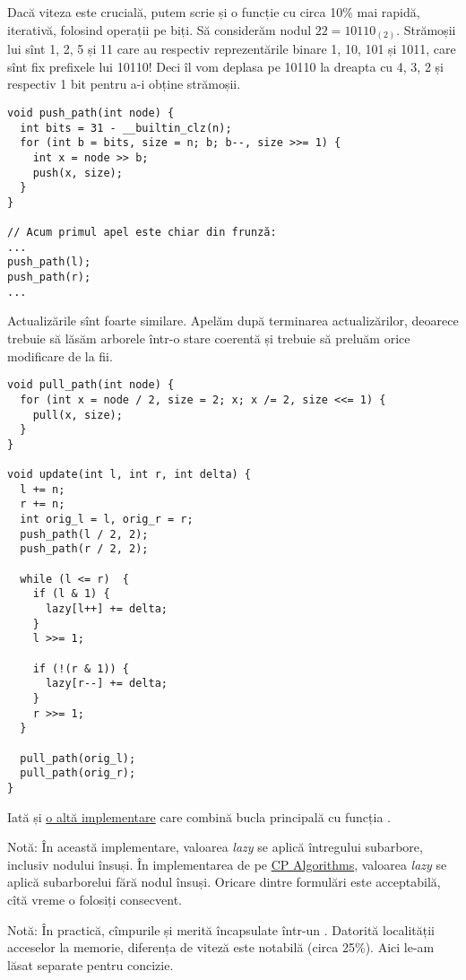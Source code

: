 Dacă viteza este crucială, putem scrie și o funcție  cu circa 10\% mai rapidă, iterativă, folosind operații pe biți. Să considerăm nodul $22=10110_{(2)}$. Strămoșii lui sînt 1, 2, 5 și 11 care au respectiv reprezentările binare 1, 10, 101 și 1011, care sînt fix prefixele lui 10110! Deci îl vom deplasa pe 10110 la dreapta cu 4, 3, 2 și respectiv 1 bit pentru a-i obține strămoșii.

\begin{verbatim}
void push_path(int node) {
  int bits = 31 - __builtin_clz(n);
  for (int b = bits, size = n; b; b--, size >>= 1) {
    int x = node >> b;
    push(x, size);
  }
}

// Acum primul apel este chiar din frunză:
...
push_path(l);
push_path(r);
...
\end{verbatim}

Actualizările sînt foarte similare. Apelăm  după terminarea actualizărilor, deoarece trebuie să lăsăm arborele într-o stare coerentă și trebuie să preluăm orice modificare de la fii.

\begin{verbatim}
void pull_path(int node) {
  for (int x = node / 2, size = 2; x; x /= 2, size <<= 1) {
    pull(x, size);
  }
}

void update(int l, int r, int delta) {
  l += n;
  r += n;
  int orig_l = l, orig_r = r;
  push_path(l / 2, 2);
  push_path(r / 2, 2);

  while (l <= r)  {
    if (l & 1) {
      lazy[l++] += delta;
    }
    l >>= 1;

    if (!(r & 1)) {
      lazy[r--] += delta;
    }
    r >>= 1;
  }

  pull_path(orig_l);
  pull_path(orig_r);
}
\end{verbatim}

Iată și \href{https://codeforces.com/blog/entry/18051}{o altă implementare} care combină bucla  principală cu funcția .

Notă: În această implementare, valoarea \textit{lazy} se aplică întregului subarbore, inclusiv nodului însuși. În implementarea de pe \href{https://cp-algorithms.com/data_structures/segment_tree.html#adding-on-segments-querying-for-maximum}{CP Algorithms}, valoarea \textit{lazy} se aplică subarborelui fără nodul însuși. Oricare dintre formulări este acceptabilă, cîtă vreme o folosiți consecvent.

Notă: În practică, cîmpurile  și  merită încapsulate într-un . Datorită localității acceselor la memorie, diferența de viteză este notabilă (circa 25\%). Aici le-am lăsat separate pentru concizie.

